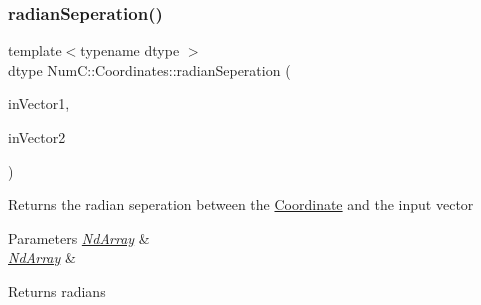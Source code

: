 \subsubsection{\texorpdfstring{radian\+Seperation()}{radianSeperation()}\hspace{0.1cm}{\footnotesize\ttfamily [2/2]}}
{\footnotesize\ttfamily template$<$typename dtype $>$ \\
dtype Num\+C\+::\+Coordinates\+::radian\+Seperation (\begin{DoxyParamCaption}\item[{const \mbox{\hyperlink{class_num_c_1_1_nd_array}{Nd\+Array}}$<$ dtype $>$ \&}]{in\+Vector1,  }\item[{const \mbox{\hyperlink{class_num_c_1_1_nd_array}{Nd\+Array}}$<$ dtype $>$ \&}]{in\+Vector2 }\end{DoxyParamCaption})}

Returns the radian seperation between the \mbox{\hyperlink{class_num_c_1_1_coordinates_1_1_coordinate}{Coordinate}} and the input vector


\begin{DoxyParams}{Parameters}
{\em \mbox{\hyperlink{class_num_c_1_1_nd_array}{Nd\+Array}}} & \\
\hline
{\em \mbox{\hyperlink{class_num_c_1_1_nd_array}{Nd\+Array}}} & \\
\hline
\end{DoxyParams}
\begin{DoxyReturn}{Returns}
radians 
\end{DoxyReturn}
